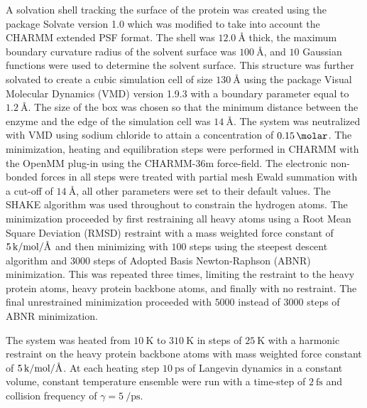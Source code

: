 A solvation shell tracking the surface of the protein was created using the package Solvate version 1.0 \cite{grubmullerSolvate} which was modified to take into account the CHARMM extended PSF format. The shell was $\SI{12.0}{\angstrom}$ thick, the maximum boundary curvature radius of the solvent surface was $\SI{100}{\angstrom}$, and $10$ Gaussian functions were used to determine the solvent surface. This structure was further solvated to create a cubic simulation cell of size $\SI{130}{\angstrom}$ using the package Visual Molecular Dynamics (VMD) version 1.9.3 \cite{HUMP96} with a boundary parameter equal to $\SI{1.2}{\angstrom}$. The size of the box was chosen so that the minimum distance between the enzyme and the edge of the simulation cell was  $\SI{14}{\angstrom}$. The system was neutralized with VMD using sodium chloride to attain a concentration of $\SI{0.15}{\molar}$. 
The minimization, heating and equilibration steps were performed in CHARMM with the OpenMM \cite{OpenMMRapidDevelopment} plug-in using the CHARMM-36m \cite{huangCHARMM36AllatomAdditive2013} force-field. The electronic non-bonded forces in all steps were treated with partial mesh Ewald summation with a cut-off of $\SI{14}{\angstrom}$, all other parameters were set to their default values. The SHAKE \cite{ryckaertNumericalIntegrationCartesian1977b} algorithm was used throughout to constrain the hydrogen atoms. The minimization proceeded by first restraining all heavy atoms  using a Root Mean Square Deviation (RMSD) restraint with a mass weighted force constant of $\SI{5}{\kilo\cal\per\mol\per\angstrom}$ and then minimizing with $100$ steps using the steepest descent algorithm and $3000$ steps of Adopted Basis Newton-Raphson (ABNR) minimization. This was repeated three times,  limiting the  restraint to the heavy protein atoms, heavy protein backbone atoms, and finally with no restraint. The final unrestrained minimization proceeded with $5000$ instead of $3000$ steps of ABNR minimization. 

The system was heated from $\SI{10}{\kelvin}$ to $\SI{310}{\kelvin}$ in steps of $\SI{25}{\kelvin}$ with a harmonic restraint on the heavy protein backbone atoms with mass weighted force constant of $\SI{5}{\kilo\cal\per\mol\per\angstrom}$. At each heating step $\SI{10}{\pico\second}$ of Langevin dynamics in a constant volume, constant temperature ensemble were run with a time-step of $\SI{2}{\femto\second}$ and collision frequency of $\gamma=\SI{5}{\per\pico\second}$. 

